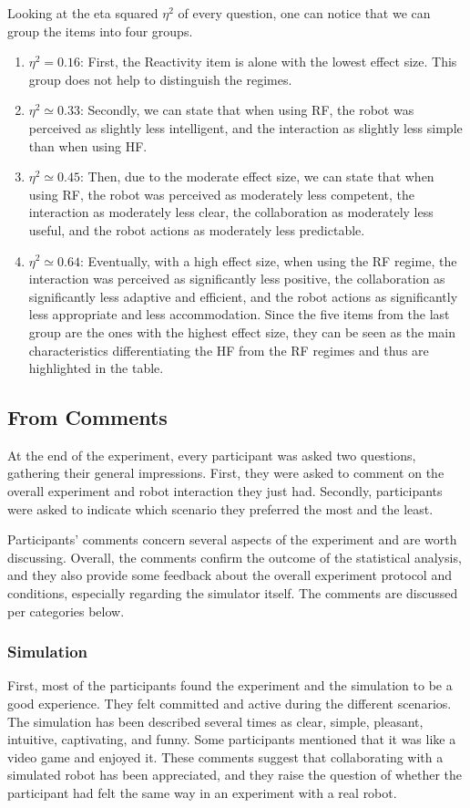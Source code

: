Looking at the eta squared $\eta^2$ of every question, one can notice that we can group the items into four groups. 
\begin{enumerate}
    \item $\eta^2=0.16$: First, the Reactivity item is alone with the lowest effect size. This group does not help to distinguish the regimes. 
    \item $\eta^2 \simeq 0.33$: Secondly, we can state that when using RF, the robot was perceived as slightly less intelligent, and the interaction as slightly less simple than when using HF. 
    \item $\eta^2 \simeq 0.45$: Then, due to the moderate effect size, we can state that when using RF, the robot was perceived as moderately less competent, the interaction as moderately less clear, the collaboration as moderately less useful, and the robot actions as moderately less predictable. 
    \item $\eta^2 \simeq 0.64$: Eventually, with a high effect size, when using the RF regime, the interaction was perceived as significantly less positive, the collaboration as significantly less adaptive and efficient, and the robot actions as significantly less appropriate and less accommodation. Since the five items from the last group are the ones with the highest effect size, they can be seen as the main characteristics differentiating the HF from the RF regimes and thus are highlighted in the table.
\end{enumerate}

\subsection{From Comments}

At the end of the experiment, every participant was asked two questions, gathering their general impressions. First, they were asked to comment on the overall experiment and robot interaction they just had. Secondly, participants were asked to indicate which scenario they preferred the most and the least. 

Participants' comments concern several aspects of the experiment and are worth discussing. Overall, the comments confirm the outcome of the statistical analysis, and they also provide some feedback about the overall experiment protocol and conditions, especially regarding the simulator itself. The comments are discussed per categories below. 

\subsubsection{Simulation}
First, most of the participants found the experiment and the simulation to be a good experience. They felt committed and active during the different scenarios. 
The simulation has been described several times as clear, simple, pleasant, intuitive, captivating, and funny. 
Some participants mentioned that it was like a video game and enjoyed it. 
These comments suggest that collaborating with a simulated robot has been appreciated, and they raise the question of whether the participant had felt the same way in an experiment with a real robot. 

